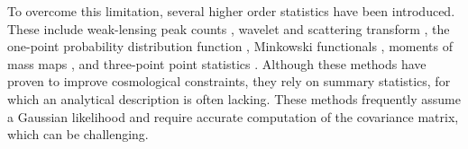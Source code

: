 \documentclass{aa}
\begin{document}
To overcome this limitation, several higher order statistics have been introduced. These include weak-lensing peak counts \citep{liu2015cosmology,  liu2015cosmological, lin2015new, kacprzak2016cosmology, peel2017cosmological, shan2018kids, martinet2018kids, ajani2020constraining, harnois2021cosmic, zurcher2022dark}, wavelet and scattering transform \citep{ajani2021starlet, cheng2021weak}, the one-point probability distribution function \citep[PDF][]{liu2019constraining, uhlemann2020fisher, boyle2021nuw}, Minkowski functionals \citep{kratochvil2012probing, petri2013cosmology}, moments of mass maps \citep{gatti2021dark},  and three-point  point statistics \citep{takada2004cosmological, semboloni2011weak, rizzato2019tomographic, halder2021integrated}. 
Although these methods have proven to improve cosmological constraints, they rely on summary statistics, for which an analytical description is often lacking. These methods frequently assume a Gaussian likelihood and require accurate computation of the covariance matrix, which can be challenging.
\end{document}
